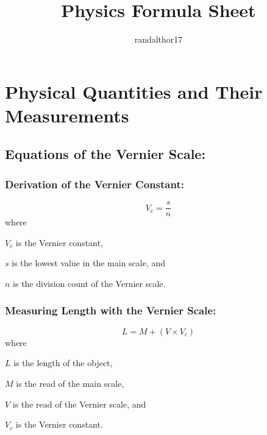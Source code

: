 \documentclass[a4paper]{report}
\title{Physics Formula Sheet}
\author{randalthor17}
\begin{document}
\maketitle
\tableofcontents
\chapter{Physical Quantities and Their Measurements}
    \section{Equations of the Vernier Scale: }
        \subsection{Derivation of the Vernier Constant: }
            \begin{equation}
                V_c = \frac{s}{n}
            \end{equation}
            where 
            \begin{description}
                \item $V_c$ is the Vernier constant,
                \item $s$ is the lowest value in the main scale, and
                \item $n$ is the division count of the Vernier scale.
            \end{description}
        \subsection{Measuring Length with the Vernier Scale: }
            \begin{equation}
                L = M + (V \times V_c)
            \end{equation}
            where
            \begin{description}
                \item $L$ is the length of the object,
                \item $M$ is the read of the main scale,
                \item $V$ is the read of the Vernier scale, and
                \item $V_c$ is the Vernier constant.
            \end{description}
\end{document}
